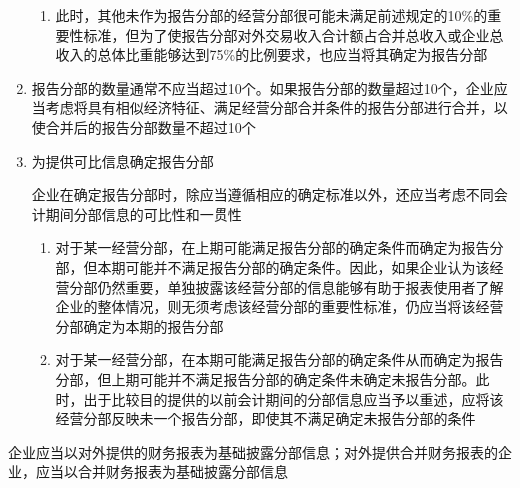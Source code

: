 \documentclass[UTF8,12pt]{ctexart}
\numberwithin{equation}{section} %
\numberwithin{figure}{section}
\numberwithin{table}{section}
\begin{document}
\begin{enumerate}
\begin{enumerate}
			\item 此时，其他未作为报告分部的经营分部很可能未满足前述规定的10\%的重要性标准，但为了使报告分部对外交易收入合计额占合并总收入或企业总收入的总体比重能够达到75\%的比例要求，也应当将其确定为报告分部
			
		\end{enumerate}
		
		\item 报告分部的数量通常不应当超过10个。如果报告分部的数量超过10个，企业应当考虑将具有相似经济特征、满足经营分部合并条件的报告分部进行合并，以使合并后的报告分部数量不超过10个
		
		\item 为提供可比信息确定报告分部
		
		企业在确定报告分部时，除应当遵循相应的确定标准以外，还应当考虑不同会计期间分部信息的可比性和一贯性
		\begin{enumerate}
			\item 对于某一经营分部，在上期可能满足报告分部的确定条件而确定为报告分部，但本期可能并不满足报告分部的确定条件。因此，如果企业认为该经营分部仍然重要，单独披露该经营分部的信息能够有助于报表使用者了解企业的整体情况，则无须考虑该经营分部的重要性标准，仍应当将该经营分部确定为本期的报告分部
			
			\item 对于某一经营分部，在本期可能满足报告分部的确定条件从而确定为报告分部，但上期可能并不满足报告分部的确定条件未确定未报告分部。此时，出于比较目的提供的以前会计期间的分部信息应当予以重述，应将该经营分部反映未一个报告分部，即使其不满足确定未报告分部的条件
		\end{enumerate}
	\end{enumerate}
	
	企业应当以对外提供的财务报表为基础披露分部信息；对外提供合并财务报表的企业，应当以合并财务报表为基础披露分部信息
	
\end{document}

